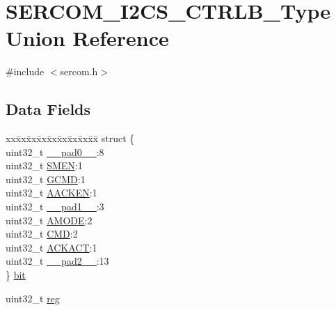 \hypertarget{union_s_e_r_c_o_m___i2_c_s___c_t_r_l_b___type}{}\section{S\+E\+R\+C\+O\+M\+\_\+\+I2\+C\+S\+\_\+\+C\+T\+R\+L\+B\+\_\+\+Type Union Reference}
\label{union_s_e_r_c_o_m___i2_c_s___c_t_r_l_b___type}


{\ttfamily \#include $<$sercom.\+h$>$}

\subsection*{Data Fields}
\begin{DoxyCompactItemize}
\item 
\begin{tabbing}
xx\=xx\=xx\=xx\=xx\=xx\=xx\=xx\=xx\=\kill
struct \{\\
\>uint32\_t \mbox{\hyperlink{union_s_e_r_c_o_m___i2_c_s___c_t_r_l_b___type_a3e57c2ef1c3ffb36722f000cc1156824}{\_\_pad0\_\_}}:8\\
\>uint32\_t \mbox{\hyperlink{union_s_e_r_c_o_m___i2_c_s___c_t_r_l_b___type_a31bff5f79c11bb1b5fe501ccb4738f12}{SMEN}}:1\\
\>uint32\_t \mbox{\hyperlink{union_s_e_r_c_o_m___i2_c_s___c_t_r_l_b___type_aef48418e042792ba139d48803d664101}{GCMD}}:1\\
\>uint32\_t \mbox{\hyperlink{union_s_e_r_c_o_m___i2_c_s___c_t_r_l_b___type_a0d8214e4785677eedbde629512daaeb1}{AACKEN}}:1\\
\>uint32\_t \mbox{\hyperlink{union_s_e_r_c_o_m___i2_c_s___c_t_r_l_b___type_a6712ba6dd1d5b43d2d56ff8ac4e275a7}{\_\_pad1\_\_}}:3\\
\>uint32\_t \mbox{\hyperlink{union_s_e_r_c_o_m___i2_c_s___c_t_r_l_b___type_adb6c7aee390994be1ca4ada847ccbf53}{AMODE}}:2\\
\>uint32\_t \mbox{\hyperlink{union_s_e_r_c_o_m___i2_c_s___c_t_r_l_b___type_a6114f503a02e060bd76b962d5c0e35c3}{CMD}}:2\\
\>uint32\_t \mbox{\hyperlink{union_s_e_r_c_o_m___i2_c_s___c_t_r_l_b___type_aaed952b6044ad29bbba8a21ed0955ac9}{ACKACT}}:1\\
\>uint32\_t \mbox{\hyperlink{union_s_e_r_c_o_m___i2_c_s___c_t_r_l_b___type_a9ce12a63de64ef64ae2d59d128251cae}{\_\_pad2\_\_}}:13\\
\} \mbox{\hyperlink{union_s_e_r_c_o_m___i2_c_s___c_t_r_l_b___type_a80515c1523b98302accdb90d9dabf510}{bit}}\\

\end{tabbing}\item 
uint32\+\_\+t \mbox{\hyperlink{union_s_e_r_c_o_m___i2_c_s___c_t_r_l_b___type_a6b91636401516a477989a336376d7b40}{reg}}
\end{DoxyCompactItemize}


